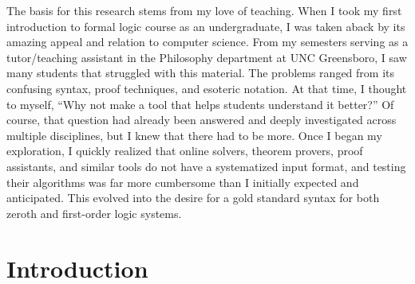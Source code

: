 \documentclass[ms]{uncgdissertationexp2}
\theoremstyle{plain}
\theoremstyle{definition}
\theoremstyle{remark}
\begin{document}
\begin{preface}
	The basis for this research stems from my love of teaching. When I took my first introduction to formal logic course as an undergraduate, I was taken aback by its amazing appeal and relation to computer science. From my semesters serving as a tutor/teaching assistant in the Philosophy department at UNC Greensboro, I saw many students that struggled with this material. The problems ranged from its confusing syntax, proof techniques, and esoteric notation. At that time, I thought to myself, ``Why not make a tool that helps students understand it better?'' Of course, that question had already been answered and deeply investigated across multiple disciplines, but I knew that there had to be more. Once I began my exploration, I quickly realized that online solvers, theorem provers, proof assistants, and similar tools do not have a systematized input format, and testing their algorithms was far more cumbersome than I initially expected and anticipated. This evolved into the desire for a gold standard syntax for both zeroth and first-order logic systems.
\end{preface}

\tableofcontents 
\listoftables   
\listoffigures   

\mainmatter %
\chapter{Introduction}\label{chapter:1}
\end{document}
